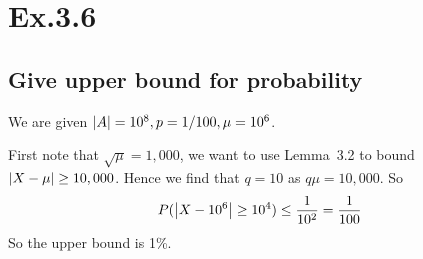 \section*{Ex.3.6}
\subsection*{Give upper bound for probability}

We are given $\abs{A}=10^8, p=1/100, \mu=10^6$. 

First note that $\sqrt{\mu} = 1,000$, we want to use Lemma~3.2 to bound $\abs*{X-\mu}\geq 10,000$. Hence we find that $q = 10$ as $q\mu= 10,000$. So
$$
P(\abs*{X-10^6}\geq 10^4)\leq \frac{1}{10^2} = \frac{1}{100}
$$
So the upper bound is 1\%.
